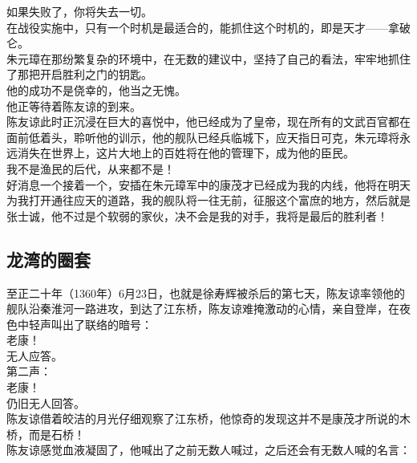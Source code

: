 \begin{multicols}{\theparacolNo}
如果失败了，你将失去一切。\\

在战役实施中，只有一个时机是最适合的，能抓住这个时机的，即是天才——拿破仑。\\

朱元璋在那纷繁复杂的环境中，在无数的建议中，坚持了自己的看法，牢牢地抓住了那把开启胜利之门的钥匙。\\

他的成功不是侥幸的，他当之无愧。\\

他正等待着陈友谅的到来。\\

陈友谅此时正沉浸在巨大的喜悦中，他已经成为了皇帝，现在所有的文武百官都在面前低着头，聆听他的训示，他的舰队已经兵临城下，应天指日可克，朱元璋将永远消失在世界上，这片大地上的百姓将在他的管理下，成为他的臣民。\\

我不是渔民的后代，从来都不是！\\

好消息一个接着一个，安插在朱元璋军中的康茂才已经成为我的内线，他将在明天为我打开通往应天的道路，我的舰队将一往无前，征服这个富庶的地方，然后就是张士诚，他不过是个软弱的家伙，决不会是我的对手，我将是最后的胜利者！\\

\subsection{龙湾的圈套}
至正二十年（1360年）6月23日，也就是徐寿辉被杀后的第七天，陈友谅率领他的舰队沿秦淮河一路进攻，到达了江东桥，陈友谅难掩激动的心情，亲自登岸，在夜色中轻声叫出了联络的暗号：\\

老康！\\

无人应答。\\

第二声：\\

老康！\\

仍旧无人回答。\\

陈友谅借着皎洁的月光仔细观察了江东桥，他惊奇的发现这并不是康茂才所说的木桥，而是石桥！\\

陈友谅感觉血液凝固了，他喊出了之前无数人喊过，之后还会有无数人喊的名言：\\


\end{multicols}

